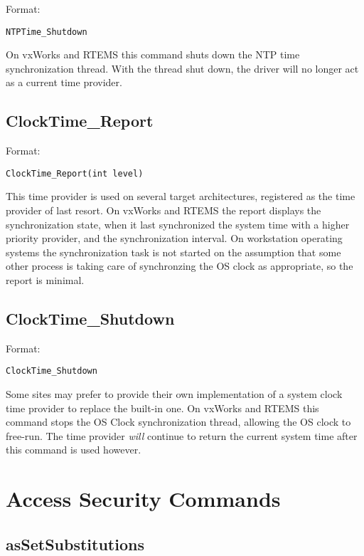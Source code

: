 Format:

\begin{verbatim}NTPTime_Shutdown
\end{verbatim}On vxWorks and RTEMS this command shuts down the NTP time synchronization thread. With the thread shut down, the 
driver will no longer act as a current time provider.

\subsection{ClockTime\_Report}

Format:

\begin{verbatim}ClockTime_Report(int level)
\end{verbatim}This time provider is used on several target architectures, registered as the time provider of last resort. On vxWorks and 
RTEMS the report displays the synchronization state, when it last synchronized the system time with a higher priority 
provider, and the synchronization interval. On workstation operating systems the synchronization task is not started on the 
assumption that some other process is taking care of synchronzing the OS clock as appropriate, so the report is minimal.

\subsection{ClockTime\_Shutdown}

Format:

\begin{verbatim}ClockTime_Shutdown
\end{verbatim}Some sites may prefer to provide their own implementation of a system clock time provider to replace the built-in one. On 
vxWorks and RTEMS this command stops the OS Clock synchronization thread, allowing the OS clock to free-run.  The 
time provider \emph{will} continue to return the current system time after this command is used however.

\section{Access Security Commands}

\subsection{asSetSubstitutions}

